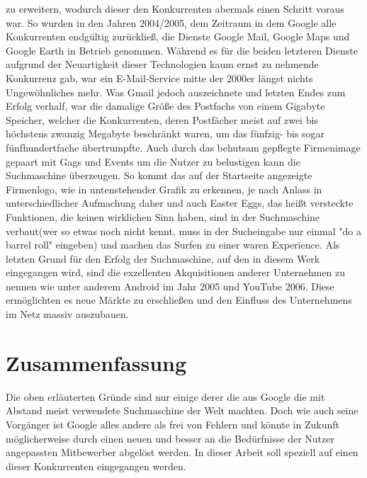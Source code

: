 zu erweitern, wodurch dieser den Konkurrenten abermals einen Schritt voraus war.
So wurden in den Jahren 2004/2005, dem Zeitraum in dem Google alle Konkurrenten endgültig zurückließ, die Dienste Google Mail,
Google Maps und Google Earth in Betrieb genommen.
Während es für die beiden letzteren Dienste aufgrund der Neuartigkeit dieser Technologien kaum ernst zu nehmende
Konkurrenz gab, war ein E-Mail-Service mitte der 2000er längst nichts Ungewöhnliches mehr.
Was Gmail jedoch auszeichnete und letzten Endes zum Erfolg verhalf, war die damalige Größe des Postfachs von einem
Gigabyte Speicher, welcher die Konkurrenten, deren Postfächer meist auf zwei bis höchstens zwanzig Megabyte beschränkt
waren, um das fünfzig- bis sogar fünfhundertfache übertrumpfte.
Auch durch das behutsam gepflegte Firmenimage gepaart mit Gags und Events um die Nutzer zu belustigen kann
die Suchmaschine überzeugen.
So kommt das auf der Startseite angezeigte Firmenlogo, wie in untenstehender Grafik zu erkennen, je nach Anlass in
unterschiedlicher Aufmachung daher und auch Easter Eggs, das heißt versteckte Funktionen, die keinen wirklichen Sinn haben,
sind in der Suchmaschine verbaut(wer so etwas noch nicht kennt, muss in der Sucheingabe nur einmal "do a barrel roll" eingeben)
und machen das Surfen zu einer waren Experience.
Als letzten Grund für den Erfolg der Suchmaschine, auf den in diesem Werk eingegangen wird, sind die exzellenten
Akquisitionen anderer Unternehmen zu nennen wie unter anderem Android im Jahr 2005 und YouTube 2006.
Diese ermöglichten es neue Märkte zu erschließen und den Einfluss des Unternehmens im Netz massiv auszubauen.

\section{Zusammenfassung}\label{sec:zusammenfassung}
Die oben erläuterten Gründe sind nur einige derer die aus Google die mit Abstand meist verwendete Suchmaschine der Welt
machten.
Doch wie auch seine Vorgänger ist Google alles andere als frei von Fehlern und könnte in Zukunft möglicherweise durch einen
neuen und besser an die Bedürfnisse der Nutzer angepassten Mitbewerber abgelöst werden.
In dieser Arbeit soll speziell auf einen dieser Konkurrenten eingegangen werden.